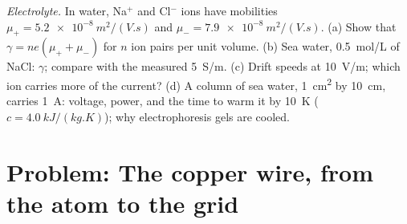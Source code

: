 \begin{exercise}[$\star\star\star$]\label{exo:b2:charges-currents-conduction:12}
\emph{Electrolyte.} In water, Na$^+$ and Cl$^-$ ions have mobilities
$\mu_+ = \qty{5.2e-8}{m^2/(V.s)}$ and $\mu_- = \qty{7.9e-8}{m^2/(V.s)}$. (a)
Show that $\gamma = ne(\mu_+ + \mu_-)$ for $n$ ion pairs per unit volume.
(b) Sea water, \qty{0.5}{mol/L} of NaCl: $\gamma$; compare with the measured
\qty{5}{S/m}. (c) Drift speeds at \qty{10}{V/m}; which ion carries more of
the current? (d) A column of sea water, \qty{1}{cm^2} by \qty{10}{cm}, carries
\qty{1}{A}: voltage, power, and the time to warm it by \qty{10}{K} ($c =
\qty{4.0}{kJ/(kg.K)}$); why electrophoresis gels are cooled.
\end{exercise}

\section{Problem: The copper wire, from the atom to the grid}

